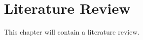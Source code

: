 \chapter{Literature Review}
\label{chap:literature-review}
This chapter will contain a literature review.
